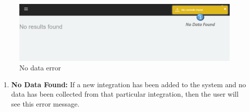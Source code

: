 \documentclass[11pt,a4paper]{article}
\begin{document}
\begin{figure}[H]
	\begin{center}
		\includegraphics[width=\linewidth]{../Images/Getting_Started/No_Data_Detailed_numbered}
		\caption{No data error}
	\end{center}
\end{figure}

\begin{enumerate}
	\item \textbf{No Data Found:} If a new integration has been added to the system and no data has been collected from that particular integration, then the user will see this error message.	
\end{enumerate}
\end{document}
